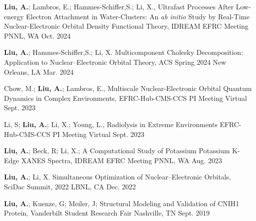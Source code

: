 


\begin{cvpresentations}


\cvpresentation
{\textbf{Liu, A.}; Lambros, E.; Hammes-Schiffer,S.; Li, X., 
Ultrafast Processes After Low-energy Electron Attachment in Water-Clusters: An \textit{ab initio} Study by Real-Time Nuclear-Electronic Orbital Density Functional Theory,
IDREAM EFRC Meeting}
{PNNL, WA} %
{Oct. 2024} %

\cvpresentation
{\textbf{Liu, A.}; Hammes-Schiffer,S.; Li, X. 
Multicomponent Cholesky Decomposition: Application to Nuclear–Electronic Orbital Theory, 
ACS Spring 2024} %
{New Orleans, LA} %
{Mar. 2024} %


\cvpresentation
{Chow, M.; \textbf{Liu, A.}; Lambros, E.,
Multiscale Nuclear-Electronic Orbital Quantum Dynamics in Complex Environments,
EFRC-Hub-CMS-CCS PI Meeting}
{Virtual} %
{Sept. 2023} %


\cvpresentation
{Li, S; \textbf{Liu, A.}; Li, X.; Young, L.,
Radiolysis in Extreme Environments
EFRC-Hub-CMS-CCS PI Meeting}
{Virtual}
{Sept. 2023} %


\cvpresentation
{\textbf{Liu, A.}; Beck, R; Li, X.;
A Computational Study of Potassium Potassium K-Edge XANES Spectra,
IDREAM EFRC Meeting}
{PNNL, WA} %
{Aug. 2023} %



\cvpresentation
{\textbf{Liu, A.}; Li, X. 
Simultaneous Optimization of Nuclear–Electronic Orbitals, 
SciDac Summit, 2022} %
{LBNL, CA} %
{Dec. 2022} %


\cvpresentation
{\textbf{Liu, A.}; Kuenze, G; Meiler, J;
Structural Modeling and Validation of CNIH1 Protein, 
Vanderbilt Student Research Fair} %
{Nashville, TN} %
{Sept. 2019} %



\end{cvpresentations}
\vspace{-1cm}
